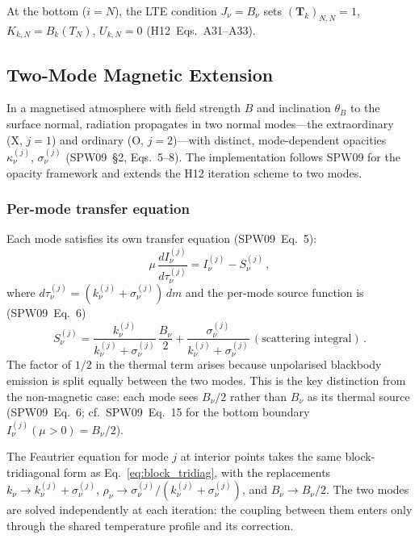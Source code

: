 At the bottom ($i=N$), the LTE condition $J_\nu = B_\nu$ sets $(\mathbf{T}_k)_{N,N}=1$, $K_{k,N}=B_k(T_N)$, $U_{k,N}=0$ (H12~Eqs.~A31--A33).

\subsection{Two-Mode Magnetic Extension}
\label{sec:magnetic}

In a magnetised atmosphere with field strength $B$ and inclination $\theta_B$ to the surface normal, radiation propagates in two normal modes---the extraordinary (X, $j\!=\!1$) and ordinary (O, $j\!=\!2$)---with distinct, mode-dependent opacities $\kappa^{(j)}_\nu$, $\sigma^{(j)}_\nu$ (SPW09~\S2, Eqs.~5--8). The implementation follows SPW09 for the opacity framework and extends the H12 iteration scheme to two modes.

\subsubsection{Per-mode transfer equation}

Each mode satisfies its own transfer equation (SPW09~Eq.~5):
\begin{equation}
  \mu\,\frac{dI^{(j)}_\nu}{d\tau^{(j)}_\nu} = I^{(j)}_\nu - S^{(j)}_\nu\,,
  \label{eq:mode_transfer}
\end{equation}
where $d\tau^{(j)}_\nu = (k^{(j)}_\nu + \sigma^{(j)}_\nu)\,dm$ and the per-mode source function is (SPW09~Eq.~6)
\begin{equation}
  S^{(j)}_\nu = \frac{k^{(j)}_\nu}{k^{(j)}_\nu + \sigma^{(j)}_\nu}\,
  \frac{B_\nu}{2}
  + \frac{\sigma^{(j)}_\nu}{k^{(j)}_\nu + \sigma^{(j)}_\nu}\,
  (\text{scattering integral})\,.
  \label{eq:mode_source}
\end{equation}
The factor of $1/2$ in the thermal term arises because unpolarised blackbody emission is split equally between the two modes. This is the key distinction from the non-magnetic case: each mode sees $B_\nu/2$ rather than $B_\nu$ as its thermal source (SPW09~Eq.~6; cf.\ SPW09~Eq.~15 for the bottom boundary $I^{(j)}_\nu(\mu>0) = B_\nu/2$).

The Feautrier equation for mode $j$ at interior points takes the same block-tridiagonal form as Eq.~\eqref{eq:block_tridiag}, with the replacements $k_\nu \to k^{(j)}_\nu + \sigma^{(j)}_\nu$, $\rho_\nu \to \sigma^{(j)}_\nu/(k^{(j)}_\nu + \sigma^{(j)}_\nu)$, and $B_\nu \to B_\nu/2$. The two modes are solved independently at each iteration: the coupling between them enters only through the shared temperature profile and its correction.

